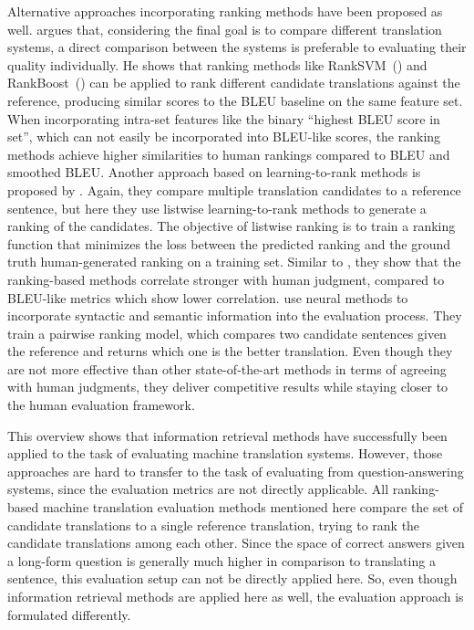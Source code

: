 Alternative approaches incorporating ranking methods have been proposed as well.
\cite{duh:2008:Ranking} argues that, considering the final goal is to compare different translation systems, a direct comparison between the systems is preferable to evaluating their quality individually.
He shows that ranking methods like RankSVM~(\cite{joachims:2002:Optimizing}) and RankBoost~(\cite{freund:2003:An}) can be applied to rank different candidate translations against the reference, producing similar scores to the BLEU baseline on the same feature set.
When incorporating intra-set features like the binary ``highest BLEU score in set'', which can not easily be incorporated into BLEU-like scores, the ranking methods achieve higher similarities to human rankings compared to BLEU and smoothed BLEU.
Another approach based on learning-to-rank methods is proposed by \cite{li:2013:Listwise}.
Again, they compare multiple translation candidates to a reference sentence, but here they use listwise learning-to-rank methods to generate a ranking of the candidates.
The objective of listwise ranking is to train a ranking function that minimizes the loss between the predicted ranking and the ground truth human-generated ranking on a training set.
Similar to \cite{duh:2008:Ranking}, they show that the ranking-based methods correlate stronger with human judgment, compared to BLEU-like metrics which show lower correlation.
\cite{guzman:2019:Pairwise} use neural methods to incorporate syntactic and semantic information into the evaluation process.
They train a pairwise ranking model, which compares two candidate sentences given the reference and returns which one is the better translation.
Even though they are not more effective than other state-of-the-art methods in terms of agreeing with human judgments, they deliver competitive results while staying closer to the human evaluation framework.

This overview shows that information retrieval methods have successfully been applied to the task of evaluating machine translation systems.
However, those approaches are hard to transfer to the task of evaluating from question-answering systems, since the evaluation metrics are not directly applicable.
All ranking-based machine translation evaluation methods mentioned here compare the set of candidate translations to a single reference translation, trying to rank the candidate translations among each other.
Since the space of correct answers given a long-form question is generally much higher in comparison to translating a sentence, this evaluation setup can not be directly applied here.
So, even though information retrieval methods are applied here as well, the evaluation approach is formulated differently.

